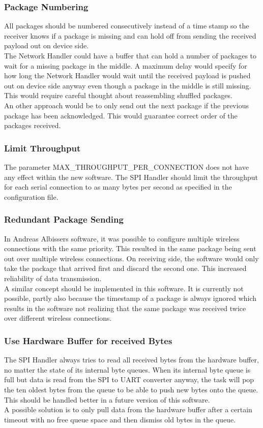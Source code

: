 \subsubsection{Package Numbering}
All packages should be numbered consecutively instead of a time stamp so the receiver knows if a package is missing and can hold off from sending the received payload out on device side.\\
The Network Handler could have a buffer that can hold a number of packages to wait for a missing package in the middle. A maximum delay would specify for how long the Network Handler would wait until the received payload is pushed out on device side anyway even though a package in the middle is still missing.\\
This would require careful thought about reassembling shuffled packages.\\
An other approach would be to only send out the next package if the previous package has been acknowledged. This would guarantee correct order of the packages received.
%
\subsubsection{Limit Throughput}
The parameter MAX\_THROUGHPUT\_PER\_CONNECTION does not have any effect within the new software. The SPI Handler should limit the throughput for each serial connection to as many bytes per second as specified in the configuration file.\\
%
\subsubsection{Redundant Package Sending}
In Andreas Albissers software, it was possible to configure multiple wireless connections with the same priority. This resulted in the same package being sent out over multiple wireless connections. On receiving side, the software would only take the package that arrived first and discard the second one. This increased reliability of data transmission.\\
A similar concept should be implemented in this software. It is currently not possible, partly also because the timestamp of a package is always ignored which results in the software not realizing that the same package was received twice over different wireless connections.
%
\subsubsection{Use Hardware Buffer for received Bytes}
The SPI Handler always tries to read all received bytes from the hardware buffer, no matter the state of its internal byte queues. When its internal byte queue is full but data is read from the SPI to UART converter anyway, the task will pop the ten oldest bytes from the queue to be able to push new bytes onto the queue. \\
This should be handled better in a future version of this software.\\
A possible solution is to only pull data from the hardware buffer after a certain timeout with no free queue space and then dismiss old bytes in the queue.
%
